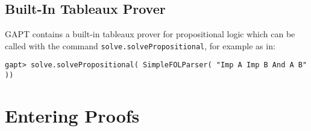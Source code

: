 \documentclass[a4paper,11pt]{article}
\begin{document}


% 

\subsection{Built-In Tableaux Prover}

GAPT contains a  built-in tableaux prover for propositional logic
which can be called with the command \texttt{solve.solvePropositional}, for example as in:
\begin{lstlisting}
gapt> solve.solvePropositional( SimpleFOLParser( "Imp A Imp B And A B" ))
\end{lstlisting}

\section{Entering Proofs}\label{sec:entering_proofs}
\end{document}
